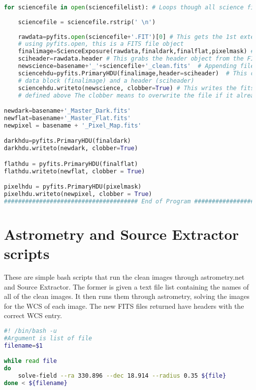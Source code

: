 \documentclass{aastex}
\begin{document}
\begin{lstlisting}[language=Python, caption= Cleans science images (YM)]
for sciencefile in open(sciencefilelist): # Loops though all science files to apply finaldark and finalflat corrections
	
	sciencefile = sciencefile.rstrip(' \n')
	
	rawdata=pyfits.open(sciencefile+'.FIT')[0] # This gets the 1st extension (starts with 0!), this is an example of 
	# using pyfits.open, this is a FITS file object
	finalimage=ScienceExposure(rawdata,finaldark,finalflat,pixelmask) # Find function above
	sciheader=rawdata.header # This grabs the header object from the FITS object rawdata
	newscience=basename+'_'+sciencefile+'_clean.fits'  # Appending filenames onto the base
	sciencehdu=pyfits.PrimaryHDU(finalimage,header=sciheader)  # This converts a numpy array into a FITS object with a 
	# data block (finalimage) and a header (sciheader)
	sciencehdu.writeto(newscience, clobber=True) # This writes the fits object to the file name newscience, which is 
	# defined above The clobber means to overwrite the file if it already exists.

newdark=basename+'_Master_Dark.fits'
newflat=basename+'_Master_Flat.fits'
newpixel = basename + '_Pixel_Map.fits'

darkhdu=pyfits.PrimaryHDU(finaldark)
darkhdu.writeto(newdark, clobber=True)

flathdu = pyfits.PrimaryHDU(finalflat)
flathdu.writeto(newflat, clobber = True)

pixelhdu = pyfits.PrimaryHDU(pixelmask)
pixelhdu.writeto(newpixel, clobber = True)
###################################### End of Program ##########################################
\end{lstlisting}

\appendix
\section{Astrometry and Source Extractor scripts} \label{code: astro sex}
These are simple bash scripts that run the clean images through astrometry.net and Source Extractor. The former is given a text file list containing the names of all of the clean images. It then runs them through astrometry, solving the images for the WCS of each image. The new FITS files returned have headers with the correct WCS entry.
\begin{lstlisting}[language = bash, caption= Runs clean images through astrometry.net (YM)]
#! /bin/bash -u
#Argument is list of file 
filename=$1

while read file
do
	solve-field --ra 330.896 --dec 18.914 --radius 0.35 ${file}  
done < ${filename}
\end{lstlisting} 
\end{document}
